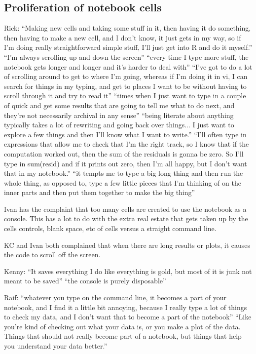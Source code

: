 \subsection{Proliferation of notebook cells}
Rick: ``Making new cells and taking some stuff in it, then having it do something, then having to make a new cell, and I don't know, it just gets in my way, so if I'm doing really straightforward simple stuff, I'll just get into R and do it myself.'' ``I'm always scrolling up and down the screen'' ``every time I type more stuff, the notebook gets longer and longer and it's harder to deal with'' ``I've got to do a lot of scrolling around to get to where I'm going, whereas if I'm doing it in vi, I can search for things in my typing, and get to places I want to be without having to scroll through it and try to read it'' ``times when I just want to type in a couple of quick and get some results that are going to tell me what to do next, and they're not necessarily archival in any sense'' ``being literate about anything typically takes a lot of rewriting and going back over things... I just want to explore a few things and then I'll know what I want to write.'' ``I'll often type in expressions that allow me to check that I'm the right track, so I know that if the computation worked out, then the sum of the residuals is gonna be zero. So I'll type in sum(resid) and if it prints out zero, then I'm all happy, but I don't want that in my notebook.'' ``it tempts me to type a big long thing and then run the whole thing, as opposed to, type a few little pieces that I'm thinking of on the inner parts and then put them together to make the big thing''

Ivan has the complaint that too many cells are created to use the notebook as a console.  This has a lot to do with the extra real estate that gets taken up by the cells controls, blank space, etc of cells versus a straight command line.

KC and Ivan both complained that when there are long results or plots, it causes the code to scroll off the screen.

Kenny: ``It saves everything I do like everything is gold, but most of it is junk not meant to be saved'' ``the console is purely disposable''

Raif: ``whatever you type on the command line, it becomes a part of your notebook, and I find it a little bit annoying, because I really type a lot of things to check my data, and I don't want that to become a part of the notebook'' ``Like you're kind of checking out what your data is, or you make a plot of the data. Things that should not really become part of a notebook, but things that help you understand your data better.''

